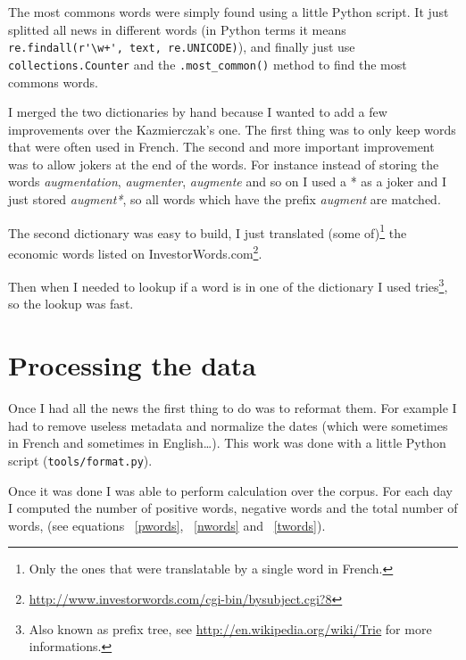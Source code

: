 \documentclass[12pt]{report}
\begin{document}
The most commons words were simply found using a little Python script. It just splitted all news in different words (in Python terms it means \lstinline!re.findall(r'\w+', text, re.UNICODE)!), and finally just use \lstinline!collections.Counter! and the \lstinline!.most_common()! method to find the most commons words.

I merged the two dictionaries by hand because I wanted to add a few improvements over the Kazmierczak's one. The first thing was to only keep words that were often used in French. The second and more important improvement was to allow jokers at the end of the words. For instance instead of storing the words \emph{augmentation}, \emph{augmenter}, \emph{augmente} and so on I used a * as a joker and I just stored \emph{augment*}, so all words which have the prefix \emph{augment} are matched.

The second dictionary was easy to build, I just translated (some of)\footnote{Only the ones that were translatable by a single word in French.} the economic words listed on InvestorWords.com\footnote{\url{http://www.investorwords.com/cgi-bin/bysubject.cgi?8}}.

Then when I needed to lookup if a word is in one of the dictionary I used tries\footnote{Also known as prefix tree, see \url{http://en.wikipedia.org/wiki/Trie} for more informations.}, so the lookup was fast.

\section{Processing the data}

Once I had all the news the first thing to do was to reformat them. For example I had to remove useless metadata and normalize the dates (which were sometimes in French and sometimes in English\ldots). This work was done with a little Python script (\lstinline!tools/format.py!).

Once it was done I was able to perform calculation over the corpus. For each day I computed the number of positive words, negative words and the total number of words, (see equations ~\ref{pwords}, ~\ref{nwords} and ~\ref{twords}).
\end{document}
